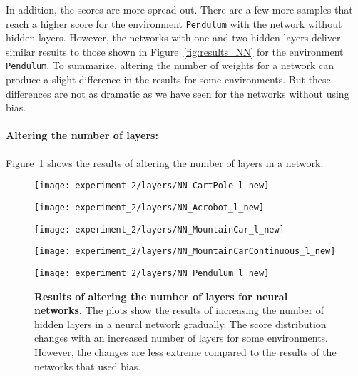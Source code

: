 In addition, the scores are more spread out. There are a few more samples that reach a higher score for the environment \verb|Pendulum| with the network without hidden layers. However, the networks with one and two hidden layers deliver similar results to those shown in Figure~\ref{fig:results_NN} for the environment \verb|Pendulum|. To summarize, altering the number of weights for a network can produce a slight difference in the results for some environments. But these differences are not as dramatic as we have seen for the networks without using bias.

\paragraph*{Altering the number of layers:} Figure~\ref{fig:experiment_2_layers} shows the results of altering the number of layers in a network.
\begin{figure}
  \centering
\texttt{[image: experiment\_2/layers/NN\_CartPole\_l\_new]}

  \vspace{0.2cm}

\texttt{[image: experiment\_2/layers/NN\_Acrobot\_l\_new]}

  \vspace{0.2cm}

\texttt{[image: experiment\_2/layers/NN\_MountainCar\_l\_new]}

  \vspace{0.2cm}

\texttt{[image: experiment\_2/layers/NN\_MountainCarContinuous\_l\_new]}

  \vspace{0.2cm}

\texttt{[image: experiment\_2/layers/NN\_Pendulum\_l\_new]}
\caption[Results of altering the number of layers for neural networks]{
  \textbf{Results of altering the number of layers for neural networks.}
   The plots show the results of increasing the number of hidden layers in a neural network gradually. The score distribution changes with an increased number of layers for some environments. However, the changes are less extreme compared to the results of the networks that used bias.
}
\label{fig:experiment_2_layers}
\end{figure}
